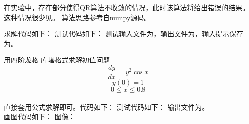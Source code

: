 \documentclass{ctexart}
\begin{document}
\begin{answer}
    在实验中，存在部分使得QR算法不收敛的情况，此时该算法将给出错误的结果。这种情况很少见。
    算法思路参考自\href{https://github.com/numpy/numpy}{numpy}源码。

    求解代码如下：
    测试代码如下：
    测试输入文件为，输出文件为，输入提示保存为。

    用四阶龙格-库塔格式求解初值问题
    \[ \frac{dy}{dx}=y^2\cos x\]
    \[y(0) = 1\]
    \[0 \le x \le 0.8\] \\

    直接套用公式求解即可。代码如下：
    测试代码如下：
    输出文件为。\\
    画图代码如下：
    图像：

\end{answer}
\end{document}
